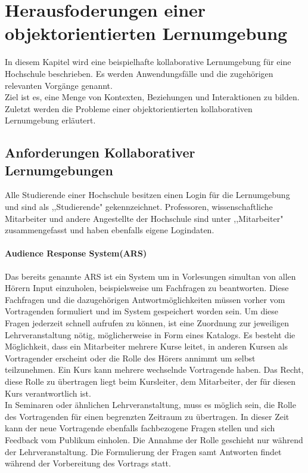 \documentclass[conference]{IEEEtran}
\begin{document}
\section{Herausfoderungen einer objektorientierten Lernumgebung}
In diesem Kapitel wird eine beispielhafte kollaborative Lernumgebung für eine Hochschule beschrieben. Es werden Anwendungsfälle und die zugehörigen relevanten Vorgänge genannt. \\
Ziel ist es, eine Menge von Kontexten, Beziehungen und Interaktionen zu bilden. Zuletzt werden die Probleme einer objektorientierten kollaborativen Lernumgebung erläutert.

\subsection{Anforderungen Kollaborativer Lernumgebungen} 
Alle Studierende einer Hochschule besitzen einen Login für die Lernumgebung und sind als ,,Studierende" gekennzeichnet. Professoren, wissenschaftliche Mitarbeiter und andere Angestellte der Hochschule sind unter ,,Mitarbeiter" zusammengefasst und haben ebenfalls eigene Logindaten.
 \paragraph{Audience Response System(ARS)} Das bereits genannte ARS ist ein System um in Vorlesungen simultan von allen Hörern Input einzuholen, beispielsweise um Fachfragen zu beantworten. Diese Fachfragen und die dazugehörigen Antwortmöglichkeiten müssen vorher vom Vortragenden formuliert und im System gespeichert worden sein. Um diese Fragen jederzeit schnell aufrufen zu können, ist eine Zuordnung zur jeweiligen Lehrveranstaltung nötig, möglicherweise in Form eines Katalogs. Es besteht die Möglichkeit, dass ein Mitarbeiter mehrere Kurse leitet, in anderen Kursen als Vortragender erscheint oder die Rolle des Hörers annimmt um selbst teilzunehmen. Ein Kurs kann mehrere wechselnde Vortragende haben. Das Recht, diese Rolle zu übertragen liegt beim Kursleiter, dem Mitarbeiter, der für diesen Kurs verantwortlich ist.\\ In Seminaren oder ähnlichen Lehrveranstaltung, muss es möglich sein, die Rolle des Vortragenden für einen begrenzten Zeitraum zu übertragen. In dieser Zeit kann der neue Vortragende ebenfalls fachbezogene Fragen stellen und sich Feedback vom Publikum einholen. Die Annahme der Rolle geschieht nur während der Lehrveranstaltung. Die Formulierung der Fragen samt Antworten findet während der Vorbereitung des Vortrags statt. 
\end{document}
